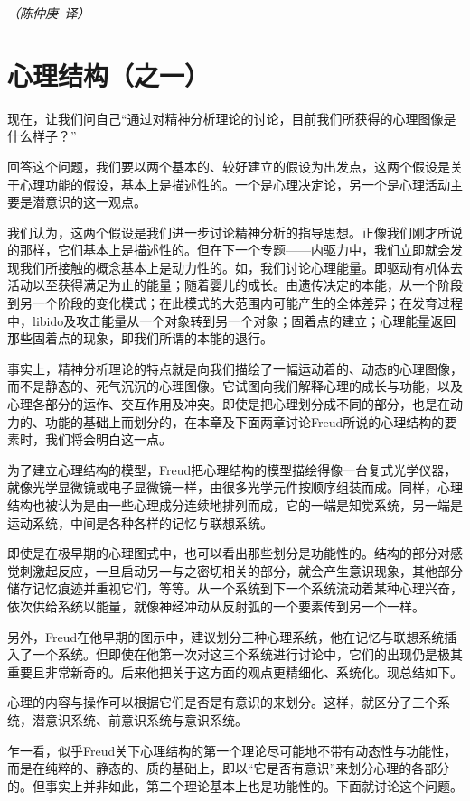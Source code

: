 \documentclass[UTF8,10pt,a4paper,openany]{book}
\newcommand{\signature}[1]{\begin{flushright}\slshape #1\end{flushright}}
\newcommand{\signatureA}{\signature{（陈仲庚~译）}}
\begin{document}
\signatureA



\chapter{心理结构（之一）}\label{3}

现在，让我们问自己“通过对精神分析理论的讨论，目前我们所获得的心理图像是什么样子？”

回答这个问题，我们要以两个基本的、较好建立的假设为出发点，这两个假设是关于心理功能的假设，基本上是描述性的。一个是心理决定论，另一个是心理活动主要是潜意识的这一观点。

我们认为，这两个假设是我们进一步讨论精神分析的指导思想。正像我们刚才所说的那样，它们基本上是描述性的。但在下一个专题——内驱力中，我们立即就会发现我们所接触的概念基本上是动力性的。如，我们讨论心理能量。即驱动有机体去活动以至获得满足为止的能量；随着婴儿的成长。由遗传决定的本能，从一个阶段到另一个阶段的变化模式；在此模式的大范围内可能产生的全体差异；在发育过程中，libido及攻击能量从一个对象转到另一个对象；固着点的建立；心理能量返回那些固着点的现象，即我们所谓的本能的退行。

事实上，精神分析理论的特点就是向我们描绘了一幅运动着的、动态的心理图像，而不是静态的、死气沉沉的心理图像。它试图向我们解释心理的成长与功能，以及心理各部分的运作、交互作用及冲突。即使是把心理划分成不同的部分，也是在动力的、功能的基础上而划分的，在本章及下面两章讨论Freud所说的心理结构的要素时，我们将会明白这一点。

为了建立心理结构的模型，Freud把心理结构的模型描绘得像一台复式光学仪器，就像光学显微镜或电子显微镜一样，由很多光学元件按顺序组装而成。同样，心理结构也被认为是由一些心理成分连续地排列而成，它的一端是知觉系统，另一端是运动系统，中间是各种各样的记忆与联想系统。

即使是在极早期的心理图式中，也可以看出那些划分是功能性的。结构的部分对感觉刺激起反应，一旦启动另一与之密切相关的部分，就会产生意识现象，其他部分储存记忆痕迹并重视它们，等等。从一个系统到下一个系统流动着某种心理兴奋，依次供给系统以能量，就像神经冲动从反射弧的一个要素传到另一个一样。

另外，Freud在他早期的图示中，建议划分三种心理系统，他在记忆与联想系统插入了一个系统。但即使在他第一次对这三个系统进行讨论中，它们的出现仍是极其重要且非常新奇的。后来他把关于这方面的观点更精细化、系统化。现总结如下。

心理的内容与操作可以根据它们是否是有意识的来划分。这样，就区分了三个系统，潜意识系统、前意识系统与意识系统。

乍一看，似乎Freud关下心理结构的第一个理论尽可能地不带有动态性与功能性，而是在纯粹的、静态的、质的基础上，即以“它是否有意识”来划分心理的各部分的。但事实上并非如此，第二个理论基本上也是功能性的。下面就讨论这个问题。
\end{document}
